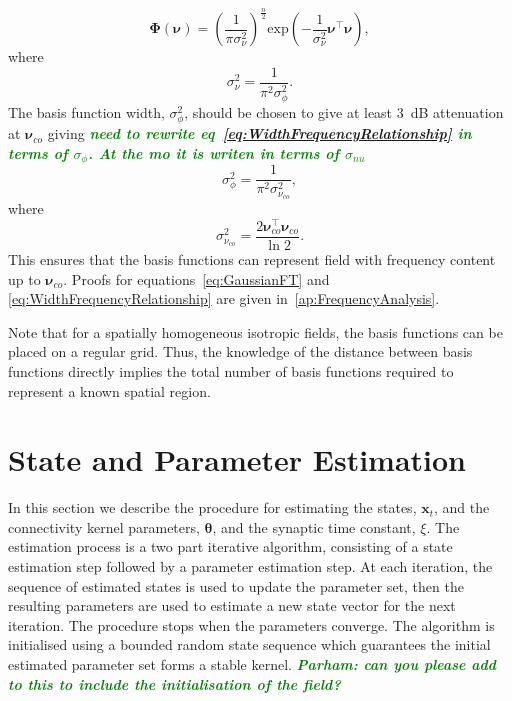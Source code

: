 \documentclass[12pt]{iopart}
\newcommand{\omg}[1]{\textsf{\emph{\textbf{\textcolor{green}{#1}}}}}
\begin{document}
\begin{equation}\label{eq:GaussianFT}
\boldsymbol\Phi(\boldsymbol \nu)=\left(\frac{1}{\pi\sigma_{\nu}^2}\right)^{\frac{n}{2}}\mathrm{exp}\left(-\frac{1}{\sigma_{\nu}^2}\boldsymbol\nu^\top \boldsymbol\nu\right),
\end{equation}
where 
\begin{equation}\label{eq:GaussianFTWidth}
	\sigma^2_{\nu} = \frac{1}{\pi^2\sigma_{\phi}^2}. 
\end{equation}
The basis function width, $\sigma^2_{\phi}$, should be chosen to give at least 3~dB attenuation at $\boldsymbol\nu_{co}$ giving \omg{need to rewrite eq~\ref{eq:WidthFrequencyRelationship} in terms of $\sigma_{\phi}$. At the mo it is writen in terms of $\sigma_{nu}$}
\begin{equation}\label{eq:WidthFrequencyRelationship}
 \sigma^2_{\phi}= \frac{1}{\pi^2\sigma_{\nu_{co}}^2},
\end{equation}
where
\begin{equation}\label{eq:WidthFrequencyRelationship}
 \sigma^2_{\nu_{co}}= \frac{2\boldsymbol\nu_{co}^\top \boldsymbol\nu_{co}}{\ln 2}.
\end{equation}
This ensures that the basis functions can represent field with frequency content up to $\boldsymbol\nu_{co}$. Proofs for equations~\ref{eq:GaussianFT} and \ref{eq:WidthFrequencyRelationship} are given in~\ref{ap:FrequencyAnalysis}.

Note that for a spatially homogeneous isotropic fields, the basis functions can be placed on a regular grid. Thus, the knowledge of the distance between basis functions directly implies the total number of basis functions required to represent a known spatial region.

% 
\section{State and Parameter Estimation}\label{StateAndParameterEstimationSection} In this section we describe the procedure for estimating the states, $\mathbf{x}_t$, and the connectivity kernel parameters, $\boldsymbol \theta$, and the synaptic time constant, $\xi$. The estimation process is a two part iterative algorithm, consisting of a state estimation step followed by a parameter estimation step. At each iteration, the sequence of estimated states is used to update the parameter set, then the resulting parameters are used to estimate a new state vector for the next iteration. The procedure stops when the parameters converge. The algorithm is initialised using a bounded random state sequence which guarantees the initial estimated parameter set forms a stable kernel. \omg{Parham: can you please add to this to include the initialisation of the field?}
\end{document}
